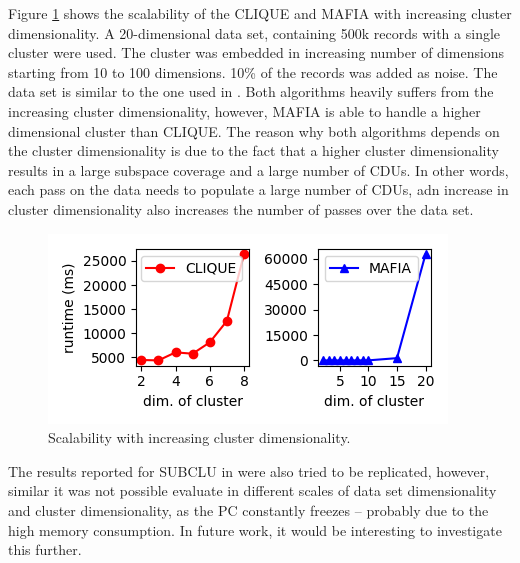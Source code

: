 Figure \ref{fig:cluster_dimensionality_vs_runtime} shows the scalability of the CLIQUE and MAFIA with increasing cluster dimensionality. A 20-dimensional data set, containing 500k records with a single cluster were used. The cluster was embedded in increasing number of dimensions starting from 10 to 100 dimensions. 10\% of the records was added as noise. The data set is similar to the one used in \cite{mafia}. Both algorithms heavily suffers from the increasing cluster dimensionality, however, MAFIA is able to handle a higher dimensional cluster than CLIQUE. The reason why both algorithms depends on the cluster dimensionality is due to the fact that a higher cluster dimensionality results in a large subspace coverage and a large number of CDUs. In other words, each pass on the data needs to populate a large number of CDUs, adn increase in cluster dimensionality also increases the number of passes over the data set.
\begin{figure}[H]
    \vspace*{-0.5cm}
    \centering
    \includegraphics[scale=0.45]{figures/cluster_dimensionality_vs_runtime.png}
    \caption{Scalability with increasing cluster dimensionality.}
    \label{fig:cluster_dimensionality_vs_runtime}
    \vspace*{-0.5cm}
\end{figure}

The results reported for SUBCLU in \cite{subclu} were also tried to be replicated, however, similar it was not possible evaluate in different scales of data set dimensionality and cluster dimensionality, as the PC constantly freezes -- probably due to the high memory consumption. In future work, it would be interesting to investigate this further.

